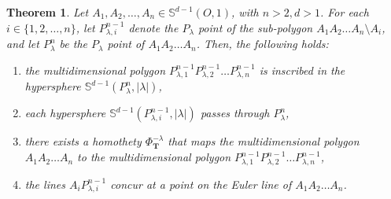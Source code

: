 \documentclass{birkjour}
\newtheorem{thm}{Theorem}[section]
\theoremstyle{definition}
\theoremstyle{remark}
\numberwithin{equation}{section}
\begin{document}
\begin{thm}\label{themG}
    Let $A_1, A_2, \ldots, A_n \in \mathbb{S}^{d-1}(O,1)$, with $n > 2, d > 1$. For each $i \in \{1,2,\ldots,n\}$, let $P_{\lambda, i}^{n-1}$ denote the $P_{\lambda}$ point of the sub-polygon $A_1A_2\ldots A_n \setminus A_i$, and let $P_{\lambda}^n$ be the $P_{\lambda}$ point of $A_1A_2\ldots A_n$. Then, the following holds:
    \begin{enumerate}
        \item the multidimensional polygon $P_{\lambda,1}^{n-1}P_{\lambda,2}^{n-1}\ldots P_{\lambda,n}^{n-1}$ is inscribed in the hypersphere $\mathbb{S}^{d-1}(P_{\lambda}^n, |\lambda|)$,
        \item each hypersphere $\mathbb{S}^{d-1}(P_{\lambda, i}^{n-1},|\lambda|)$ passes through $P_{\lambda}^{n}$,
        \item there exists a homothety $\Phi_{\mathbf{T}}^{-\lambda}$ that maps the multidimensional polygon $A_1A_2\ldots A_n$ to the multidimensional polygon $P_{\lambda,1}^{n-1}P_{\lambda,2}^{n-1}\ldots P_{\lambda,n}^{n-1}$,
        \item the lines $A_iP_{\lambda,i}^{n-1}$ concur at a point on the Euler line of $A_1A_2\ldots A_n$.
    \end{enumerate}
\end{thm}
\end{document}

